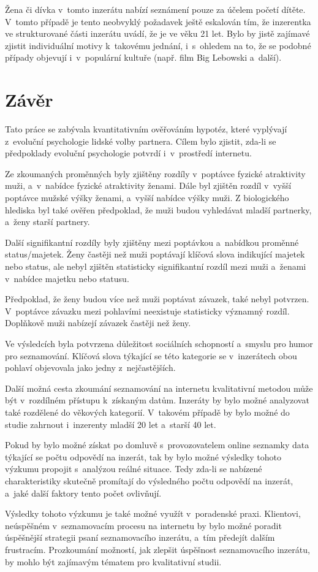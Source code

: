 \documentclass[a4paper, 12pt, notitlepage, oneside, numbers=noenddot]{report}
\begin{document}
Žena či dívka v~tomto inzerátu nabízí seznámení pouze za účelem početí
dítěte.  V~tomto případě je tento neobvyklý požadavek ještě eskalován
tím, že inzerentka ve strukturované části inzerátu uvádí, že je ve
věku 21 let. Bylo by jistě zajímavé zjistit individuální motivy
k~takovému jednání, i~s~ohledem na to, že se podobné případy objevují
i~v~populární kultuře (např. film Big Lebowski a~další).

\chapter{Závěr}

Tato práce se zabývala kvantitativním ověřováním hypotéz, které
vyplývají z~evoluční psychologie lidské volby partnera.  Cílem bylo
zjistit, zda-li se předpoklady evoluční psychologie potvrdí
i~v~prostředí internetu.

Ze zkoumaných proměnných byly zjištěny rozdíly v~poptávce fyzické
atraktivity muži, a~v~nabídce fyzické atraktivity ženami.  Dále byl
zjištěn rozdíl v~vyšší poptávce mužské výšky ženami, a~vyšší nabídce
výšky muži.  Z biologického hlediska byl také ověřen předpoklad, že
muži budou vyhledávat mladší partnerky, a~ženy starší partnery.

Další signifikantní rozdíly byly zjištěny mezi poptávkou a~nabídkou
proměnné status/majetek.  Ženy častěji než muži poptávají klíčová
slova indikující majetek nebo status, ale nebyl zjištěn statisticky
signifikantní rozdíl mezi muži a~ženami v~nabídce majetku nebo statusu.

Předpoklad, že ženy budou více než muži poptávat závazek, také nebyl
potvrzen.  V~poptávce závazku mezi pohlavími neexistuje statisticky
významný rozdíl.  Doplňkově muži nabízejí závazek častěji než ženy.

Ve výsledcích byla potvrzena důležitost sociálních schopností a~smyslu
pro humor pro seznamování.  Klíčová slova týkající se této kategorie
se v~inzerátech obou pohlaví objevovala jako jedny z~nejčastějších.

Další možná cesta zkoumání seznamování na internetu kvalitativní
metodou může být v~rozdílném přístupu k~získaným datům.  Inzeráty by
bylo možné analyzovat také rozdělené do věkových kategorií.  V~takovém
případě by bylo možné do studie zahrnout i~inzerenty mladší 20 let
a~starší 40 let.

Pokud by bylo možné získat po domluvě s~provozovatelem online seznamky
data týkající se počtu odpovědí na inzerát, tak by bylo možné výsledky
tohoto výzkumu propojit s~analýzou reálné situace.  Tedy zda-li se
nabízené charakteristiky skutečně promítají do výsledného počtu
odpovědí na inzerát, a~jaké další faktory tento počet ovlivňují.

Výsledky tohoto výzkumu je také možné využít v~poradenské praxi.
Klientovi, neúspěšném v~seznamovacím procesu na internetu by bylo
možné poradit úspěšnější strategii psaní seznamovacího inzerátu, a~tím
předejít dalším frustracím.  Prozkoumání možností, jak zlepšit
úspěšnost seznamovacího inzerátu, by mohlo být zajímavým tématem pro
kvalitativní studii.

\clearpage
\singlespacing

%

\end{document}
